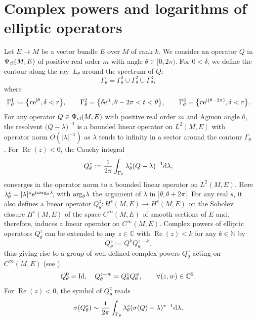 \documentclass[pdftex]{sigma}
\numberwithin{equation}{section}
\theoremstyle{definition}
\newcommand{\C}{\mathbb C}
\newcommand{\N}{\mathbb N}
\begin{document}
\section{Complex powers and logarithms of elliptic operators}\label{appendix2}
Let $E\to M$ be a vector bundle $E$ over $M$ of rank $k$. We consider an operator $Q$ in $\Psi_{\rm cl}(M, E)$ of positive real order $m$ with angle $\theta\in [0,2\pi)$. For $0<\delta$, we define the contour along the ray~$L_\theta$ around the spectrum of $Q$:
\[\Gamma_\theta=\Gamma_\theta^1\cup \Gamma_\theta^2\cup \Gamma_\theta^3 ,\]
where
\[\Gamma_\theta^1:=\bigl\{r{\rm e}^{{\rm i}\theta}, \delta< r\bigr\},\qquad \Gamma_\theta^2=\bigl\{\delta {\rm e}^{{\rm i}t}, \theta-2\pi< t<\theta\bigr\},\qquad \Gamma_\theta^3=\bigl\{r {\rm e}^{{\rm i}(\theta-2\pi)}, \delta< r\bigr\}.\]
For any operator $Q\in \Psi_{\rm cl}(M, E)$ with positive real order $m$ and Agmon angle $\theta$, the resolvent $\bigl(Q-\lambda\bigr)^{-1}$ is a bounded linear operator on $L^2(M, E)$ with operator norm $O(\vert \lambda\vert^{-1})$ as $\lambda$ tends to infinity in a sector around the contour $\Gamma_\theta$. For $\operatorname{Re}(z)<0$,
	the Cauchy integral \cite[equation~(1.5.7.1)]{Sc}
	\begin{equation*}
		Q_\theta^z:=\frac{{\rm i}}{2\pi}\int_{\Gamma_{\theta}} \lambda_\theta^z (Q-\lambda)^{-1} {\rm d}\lambda,\end{equation*}
	converges in the operator norm to a bounded linear operator on $L^2(M,E) $. Here $\lambda_\theta^z= \vert \lambda\vert^z {\rm e}^{{\rm i} z {\rm arg}_\theta\lambda}\!$, with ${\rm arg}_\theta\lambda$ the argument of $\lambda$ in $]\theta, \theta+2\pi[$.
For any real $s$, it also defines a linear operator $Q_\theta^z\colon H^s(M, E)\to H^s (M, E)$ on the Sobolev closure $H^s(M,E)$ of the space $C^\infty(M,E)$ of smooth sections of $E$ and, therefore, induces a linear operator on $C^\infty(M,E)$. Complex powers of elliptic operators $Q_\theta^z$ can be extended to any $z\in \C$ with $\operatorname{Re}(z)<k$ for any $k\in \N$ by
	\begin{equation}\label{eq:zmoinsk} Q_\theta^{z}:= Q^k Q_\theta^{z-k},\end{equation} thus giving rise to a group of well-defined complex powers $Q_\theta^z$ acting on $C^\infty(M,E)$ (see \cite[Section~1.5.7.1]{Sc})
	\[Q_\theta^0={\rm Id}, \quad Q_\theta^{z+w}=Q_\theta^{z} Q_\theta^{w},\qquad \forall (z,w)\in \C^2.\]
For $\operatorname{Re}(z)<0$, the symbol of $Q_\theta^{z}$ reads \cite[formula~(4.8.2.6)]{Sc}
\begin{equation*}	
\sigma(Q_\theta^{z})\sim\frac{{\rm i}}{2\pi} \int_{\Gamma_\theta} \lambda_\theta^{z} (\sigma(Q)-\lambda)^{*-1} {\rm d}\lambda,\end{equation*}
\end{document}
